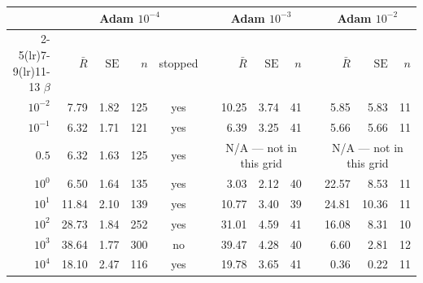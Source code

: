 \begin{tabular}{@{}r r r r c c r r r c r r r@{}}
\toprule
& \multicolumn{4}{c}{\textbf{Adam $10^{-4}$}} & & \multicolumn{3}{c}{\textbf{Adam $10^{-3}$}} & & \multicolumn{3}{c}{\textbf{Adam $10^{-2}$}} \\
\cmidrule(lr){2-5}\cmidrule(lr){7-9}\cmidrule(lr){11-13}
$\beta$ & $\bar R$ & $\mathrm{SE}$ & $n$ & stopped & & $\bar R$ & $\mathrm{SE}$ & $n$ & & $\bar R$ & $\mathrm{SE}$ & $n$ \\
\midrule
$10^{-2}$ & 7.79 & 1.82 & 125 & yes & & 10.25 & 3.74 & 41 & & 5.85 & 5.83 & 11 \\
$10^{-1}$ & 6.32 & 1.71 & 121 & yes & & 6.39 & 3.25 & 41 & & 5.66 & 5.66 & 11 \\
$0.5$ & 6.32 & 1.63 & 125 & yes & & \multicolumn{3}{c}{N/A --- not in this grid} & & \multicolumn{3}{c}{N/A --- not in this grid} \\
$10^{0}$ & 6.50 & 1.64 & 135 & yes & & 3.03 & 2.12 & 40 & & 22.57 & 8.53 & 11 \\
$10^{1}$ & 11.84 & 2.10 & 139 & yes & & 10.77 & 3.40 & 39 & & 24.81 & 10.36 & 11 \\
$10^{2}$ & 28.73 & 1.84 & 252 & yes & & 31.01 & 4.59 & 41 & & 16.08 & 8.31 & 10 \\
$10^{3}$ & 38.64 & 1.77 & 300 & no & & 39.47 & 4.28 & 40 & & 6.60 & 2.81 & 12 \\
$10^{4}$ & 18.10 & 2.47 & 116 & yes & & 19.78 & 3.65 & 41 & & 0.36 & 0.22 & 11 \\
\bottomrule
\end{tabular}
